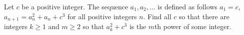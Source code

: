 Let $ c$ be a positive integer. The sequence $ a_1,a_2,\ldots$ is defined as follows $ a_1=c$,  $ a_{n+1}=a_n^2+a_n+c^3$ for all positive integers $ n$. Find all $ c$ so that there are integers $ k\ge1$ and $ m\ge2$ so that $ a_k^2+c^3$ is the $ m$th power of some integer.